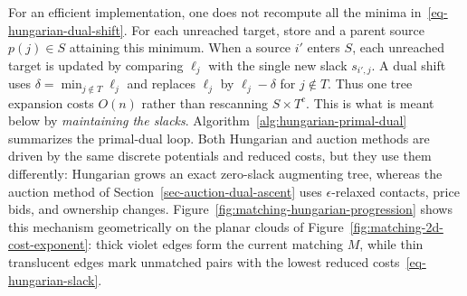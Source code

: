 For an efficient implementation, one does not recompute all the minima in~\eqref{eq-hungarian-dual-shift}. For each unreached target, store
and a parent source $p(j)\in S$ attaining this minimum. When a source $i'$ enters $S$, each unreached target is updated by comparing $\ell_j$ with the single new slack $s_{i',j}$. A dual shift uses $\delta=\min_{j\notin T}\ell_j$ and replaces $\ell_j$ by $\ell_j-\delta$ for $j\notin T$. Thus one tree expansion costs $O(n)$ rather than rescanning $S\times T^c$. This is what is meant below by \emph{maintaining the slacks}.
Algorithm~\ref{alg:hungarian-primal-dual} summarizes the primal-dual loop. Both Hungarian and auction methods are driven by the same discrete potentials and reduced costs, but they use them differently: Hungarian grows an exact zero-slack augmenting tree, whereas the auction method of Section~\ref{sec-auction-dual-ascent} uses $\epsilon$-relaxed contacts, price bids, and ownership changes. Figure~\ref{fig:matching-hungarian-progression} shows this mechanism geometrically on the planar clouds of Figure~\ref{fig:matching-2d-cost-exponent}: thick violet edges form the current matching $M$, while thin translucent edges mark unmatched pairs with the lowest reduced costs~\eqref{eq-hungarian-slack}.

